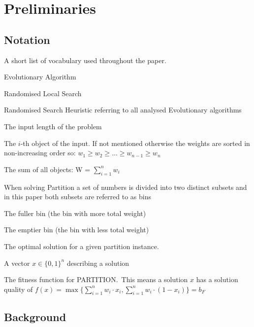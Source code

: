 
\chapter{Preliminaries}\label{ch:preliminaries}

\section{Notation}
A short list of vocabulary used throughout the paper.
\begin{description}[leftmargin=!,labelwidth=\widthof{\bfseries RSH}]
    \item[EA] Evolutionary Algorithm
    \item[RLS] Randomised Local Search
    \item[RSH] Randomised Search Heuristic referring to all analysed Evolutionary algorithms
    \item[$n$] The input length of the problem
    \item[$w_i$] The $i$-th object of the input. If not mentioned otherwise the weights are sorted in non-increasing order so: \(w_1 \ge w_2 \ge \ldots \ge w_{n-1} \ge w_{n}\)
    \item[$W$] The sum of all objects: W = $\sum_{i=1}^{n}w_i$
    \item[bin] When solving Partition a set of numbers is divided into two distinct subsets and in this paper both subsets are referred to as bins
    \item[$b_F$] The fuller bin (the bin with more total weight)
    \item[$b_E$] The emptier bin (the bin with less total weight)
    \item[$opt$] The optimal solution for a given partition instance.
    \item[$x$] A vector $x \in {\{0, 1\}}^n$ describing a solution
    \item[$f(x)$] The fitness function for PARTITION.\ This means a solution $x$ has a solution quality of \(f(x)=\max\{\sum_{i=1}^{n}w_i\cdot x_i, \sum_{i=1}^{n}w_i\cdot(1-x_i)\}=b_F\)
\end{description}

\section{Background}
